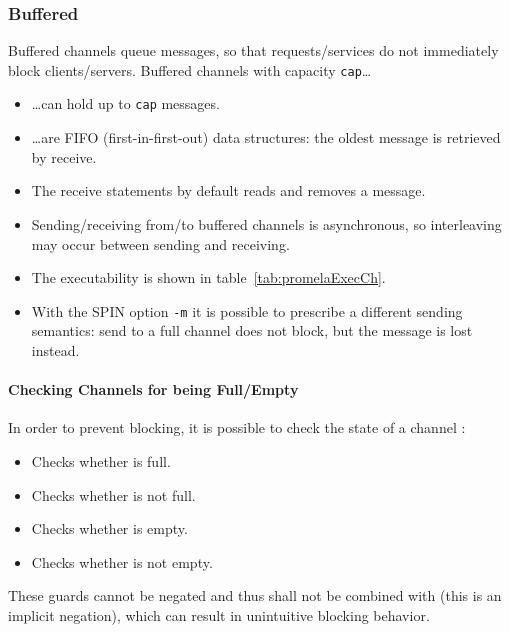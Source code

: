 			\subsubsection{Buffered}
				Buffered channels queue messages, so that requests/services do not immediately block clients/servers. Buffered channels with capacity \texttt{cap}\dots
				\begin{itemize}
					\item \dots can hold up to \texttt{cap} messages.
					\item \dots are FIFO (first-in-first-out) data structures: the oldest message is retrieved by receive.
					\item The receive statements by default reads and removes a message.
					\item Sending/receiving from/to buffered channels is asynchronous, so interleaving may occur between sending and receiving.
					\item The executability is shown in table~\ref{tab:promelaExecCh}.
					\item With the SPIN option \texttt{-m} it is possible to prescribe a different sending semantics: send to a full channel does not block, but the message is lost instead.
				\end{itemize}

				\paragraph{Checking Channels for being Full/Empty}
					In order to prevent blocking, it is possible to check the state of a channel :
					\begin{itemize}
						\item {}   \tabto{2cm} Checks whether  is full.
						\item {}  \tabto{2cm} Checks whether  is not full.
						\item {}  \tabto{2cm} Checks whether  is empty.
						\item {} \tabto{2cm} Checks whether  is not empty.
					\end{itemize}

					These guards cannot be negated and thus shall not be combined with  (this is an implicit negation), which can result in unintuitive blocking behavior.

